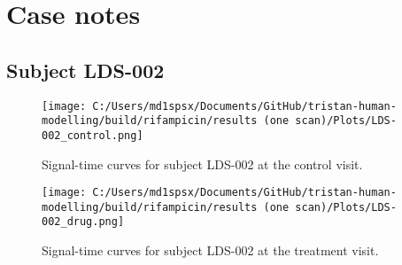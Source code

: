 \documentclass{epflreport}%
\begin{document}
\section{Case notes}%
\label{sec:Casenotes}%

%
\subsection{Subject LDS{-}002}%
\label{subsec:SubjectLDS{-}002}%

%


\begin{figure}[h!]%
\centering%
\texttt{[image: C:/Users/md1spsx/Documents/GitHub/tristan-human-modelling/build/rifampicin/results (one scan)/Plots/LDS-002\_control.png]}%
\caption{Signal{-}time curves for subject LDS{-}002 at the control visit.}%
\end{figure}

%


\begin{figure}[h!]%
\centering%
\texttt{[image: C:/Users/md1spsx/Documents/GitHub/tristan-human-modelling/build/rifampicin/results (one scan)/Plots/LDS-002\_drug.png]}%
\caption{Signal{-}time curves for subject LDS{-}002 at the treatment visit.}%
\end{figure}
\end{document}
